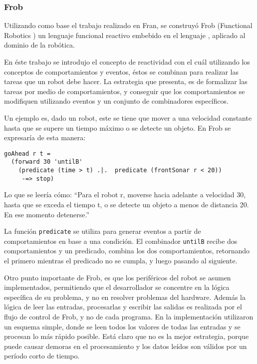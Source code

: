 \subsubsection{Frob}

  Utilizando como base el trabajo realizado en Fran, se construyó Frob
(Functional Robotics \cite{petersonhudakelliot99:lambdainmotion}
\cite{petersonhagerhudak99:frob})
un lenguaje funcional reactivo embebido en el lenguaje \haskell{},
aplicado al dominio de la robótica.
  
  En éste trabajo se introdujo el concepto de reactividad con el cuál
utilizando los conceptos de comportamientos y eventos, éstos se combinan
para realizar las tareas que un robot debe hacer.
  La estrategia que presenta, es de formalizar las tareas por medio de
comportamientos, y conseguir que los comportamientos se modifiquen
utilizando eventos y un conjunto de combinadores específicos.

  Un ejemplo es, dado un robot, este se tiene que mover a una velocidad
constante hasta que se supere un tiempo máximo o se detecte un objeto.
  En Frob se expresaría de esta manera:


\begin{verbatim}
goAhead r t =
  (forward 30 'untilB'
    (predicate (time > t) .|.  predicate (frontSonar r < 20))
     -=> stop)
\end{verbatim}


  Lo que se leería cómo: ``Para el robot r, moverse hacia adelante a
velocidad 30, hasta que se exceda el tiempo t, o se detecte un objeto
a menos de distancia 20. En ese momento detenerse.''

  La función \texttt{predicate} se utiliza para generar eventos a partir
de comportamientos en base a una condición.
  El combinador \texttt{untilB} recibe dos comportamientos y un predicado,
combina los dos comportamientos, retornando el primero mientras el predicado
no se cumpla, y luego pasando al siguiente.


  Otro punto importante de Frob, es que los periféricos del robot se
asumen implementados, permitiendo que el desarrollador se concentre
en la lógica específica de su problema, y no en resolver problemas
del hardware.
  Además la lógica de leer las entradas, procesarlas y escribir las salidas
es realizada por el flujo de control de Frob, y no de cada programa.
  En la implementación utilizaron un esquema simple, donde se leen todos
los valores de todas las entradas y se procesan lo más rápido posible.
  Está claro que no es la mejor estrategia, porque puede causar demoras
en el procesamiento y los datos leídos son válidos por un
período corto de tiempo.


